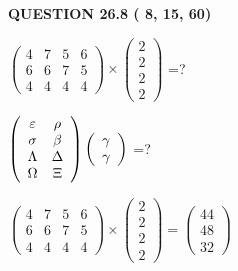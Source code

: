 \documentclass[12pt]{article}
\begin{document}
   
  
\vspace{0.2in}
  
{\textbf{\Large{QUESTION
26.8 
 (          8,         15,         60)
}}}
  
  
 
$ \left( \begin{array}{ccccccccc}
           4 & 
           7 & 
           5 & 
           6 \\ 
           6 & 
           6 & 
           7 & 
           5 \\ 
           4 & 
           4 & 
           4 & 
           4
\end{array}\right) \times
\left( \begin{array}{c}
           2 \\ 
           2 \\ 
           2 \\ 
           2
\end{array}\right) $ =?
 
 
$  %
 \left( \begin{array}
 {
 c
 c
 }
 \varepsilon & 
 \rho \\ 
 \sigma & 
 \beta \\ 
 \Lambda & 
 \Delta \\ 
 \Omega & 
                    \Xi
 \end{array} \right)
 \left( \begin{array}
 {
 c
 }
 \gamma \\ 
 \gamma
 \end{array} \right)
$ =?
 
 
 
\noindent{}
 
 

 
$\left( \begin{array}{ccccccccccccccc}
           4 & 
           7 & 
           5 & 
           6 \\ 
           6 & 
           6 & 
           7 & 
           5 \\ 
           4 & 
           4 & 
           4 & 
           4
\end{array}\right) \times
\left( \begin{array}{c}
           2 \\ 
           2 \\ 
           2 \\ 
           2
\end{array}\right)  =
\left( \begin{array}{c}
          44 \\ 
          48 \\ 
          32
\end{array}\right)  $
 
\end{document}

